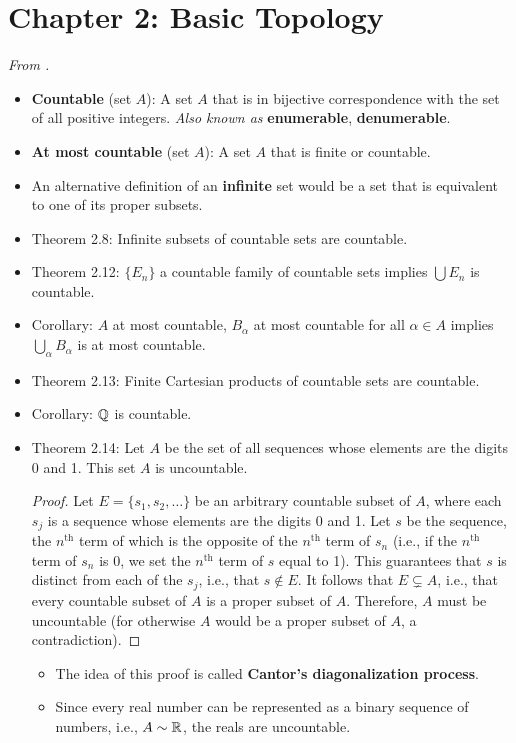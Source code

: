 \documentclass[../../notes.tex]{subfiles}
\begin{document}
\section{Chapter 2: Basic Topology}
\emph{From \textcite{bib:Rudin}.}
\begin{itemize}
    \item {}\textbf{Countable} (set $A$): A set $A$ that is in bijective correspondence with the set of all positive integers. \emph{Also known as} \textbf{enumerable}, \textbf{denumerable}.
    \item \textbf{At most countable} (set $A$): A set $A$ that is finite or countable.
    \item An alternative definition of an \textbf{infinite} set would be a set that is equivalent to one of its proper subsets.
    \item Theorem 2.8: Infinite subsets of countable sets are countable.
    \item Theorem 2.12: $\{E_n\}$ a countable family of countable sets implies $\bigcup E_n$ is countable.
    \item Corollary: $A$ at most countable, $B_\alpha$ at most countable for all $\alpha\in A$ implies $\bigcup_\alpha B_\alpha$ is at most countable.
    \item Theorem 2.13: Finite Cartesian products of countable sets are countable.
    \item Corollary: $\mathbb{Q}$ is countable.
    \item Theorem 2.14: Let $A$ be the set of all sequences whose elements are the digits 0 and 1. This set $A$ is uncountable.
    \begin{proof}
        Let $E=\{s_1,s_2,\dots\}$ be an arbitrary countable subset of $A$, where each $s_j$ is a sequence whose elements are the digits 0 and 1. Let $s$ be the sequence, the $n^\text{th}$ term of which is the opposite of the $n^\text{th}$ term of $s_n$ (i.e., if the $n^\text{th}$ term of $s_n$ is 0, we set the $n^\text{th}$ term of $s$ equal to 1). This guarantees that $s$ is distinct from each of the $s_j$, i.e., that $s\notin E$. It follows that $E\subsetneq A$, i.e., that every countable subset of $A$ is a proper subset of $A$. Therefore, $A$ must be uncountable (for otherwise $A$ would be a proper subset of $A$, a contradiction).
    \end{proof}
    \begin{itemize}
        \item The idea of this proof is called \textbf{Cantor's diagonalization process}.
        \item Since every real number can be represented as a binary sequence of numbers, i.e., $A\sim\mathbb{R}$, the reals are uncountable.

\end{itemize}
\end{itemize}
\end{document}
